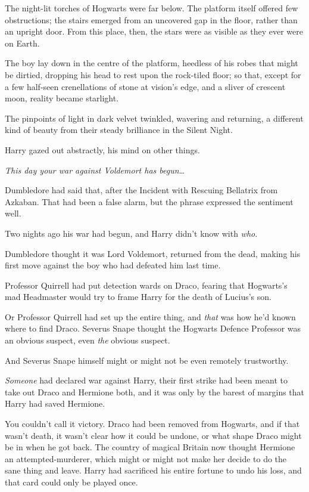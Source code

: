The night-lit torches of Hogwarts were far below. The platform itself
offered few obstructions; the stairs emerged from an uncovered gap in
the floor, rather than an upright door. From this place, then, the stars
were as visible as they ever were on Earth.

The boy lay down in the centre of the platform, heedless of his robes
that might be dirtied, dropping his head to rest upon the rock-tiled
floor; so that, except for a few half-seen crenellations of stone at
vision's edge, and a sliver of crescent moon, reality became starlight.

The pinpoints of light in dark velvet twinkled, wavering and returning,
a different kind of beauty from their steady brilliance in the Silent
Night.

Harry gazed out abstractly, his mind on other things.

\emph{This day your war against Voldemort has begun\ldots{}}

Dumbledore had said that, after the Incident with Rescuing Bellatrix
from Azkaban. That had been a false alarm, but the phrase expressed the
sentiment well.

Two nights ago his war had begun, and Harry didn't know with \emph{who}.

Dumbledore thought it was Lord Voldemort, returned from the dead, making
his first move against the boy who had defeated him last time.

Professor Quirrell had put detection wards on Draco, fearing that
Hogwarts's mad Headmaster would try to frame Harry for the death of
Lucius's son.

Or Professor Quirrell had set up the entire thing, and \emph{that} was
how he'd known where to find Draco. Severus Snape thought the Hogwarts
Defence Professor was an obvious suspect, even \emph{the} obvious
suspect.

And Severus Snape himself might or might not be even remotely
trustworthy.

\emph{Someone} had declared war against Harry, their first strike had
been meant to take out Draco and Hermione both, and it was only by the
barest of margins that Harry had saved Hermione.

You couldn't call it victory. Draco had been removed from Hogwarts, and
if that wasn't death, it wasn't clear how it could be undone, or what
shape Draco might be in when he got back. The country of magical Britain
now thought Hermione an attempted-murderer, which might or might not
make her decide to do the sane thing and leave. Harry had sacrificed his
entire fortune to undo his loss, and that card could only be played
once.

